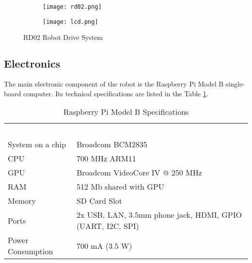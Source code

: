 \begin{figure}[h!]
\centering 

	\begin{subfigure}[h]{0.45\textwidth}
		\centering
			\texttt{[image: rd02.png]}
			\label{fig:rd02}
	\end{subfigure}
	\begin{subfigure}[h]{0.45\textwidth}
		\centering 
			\texttt{[image: lcd.png]}
			\label{fig:lcd_us}
	\end{subfigure}

\caption{RD02 Robot Drive System}
\label{fig:modules}
\end{figure}

\subsection*{Electronics}
 
The main electronic component of the robot is the Raspberry Pi Model
B single-board computer. Its technical specifications are listed in the Table
\ref{tab:rpi_specs}.

\begin{table}[h!]
	\setlength\extrarowheight{2pt}
    \begin{tabularx}{\textwidth}{XX}
    
    ~                 & ~                                                           \\
    System on a chip  & Broadcom BCM2835                                            \\
    CPU               & 700 MHz ARM11                                               \\
    GPU               & Broadcom VideoCore IV @ 250 MHz                             \\
    RAM               & 512 Mb shared with GPU                                      \\
    Memory            & SD Card Slot                                                \\
    Ports             & 2x USB, LAN, 3.5mm phone jack, HDMI,  GPIO (UART, I2C, SPI) \\
    Power Consumption & 700 mA (3.5 W)                                              \\
    
    \end{tabularx}
    \caption{Raspberry Pi Model B Specifications}
    \label{tab:rpi_specs}
\end{table}

